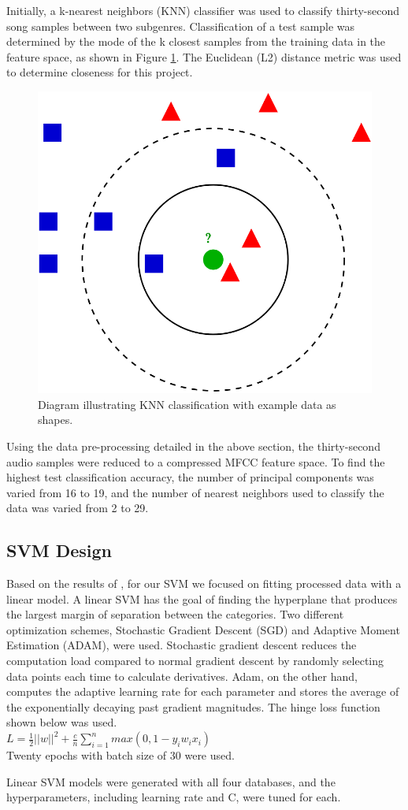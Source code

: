\documentclass[letterpaper, 12 pt, conference]{ieeeconf}  %
\begin{document}
Initially, a k-nearest neighbors (KNN) classifier was used to classify thirty-second song samples between two subgenres. 
Classification of a test sample was determined by the mode of the k closest samples from the training data in the feature space, as shown in Figure \ref{fig:knnimg}. The Euclidean (L2) distance metric was used to determine closeness for this project.
\begin{figure}[!ht]
  \centering
  \includegraphics[width=.2\textwidth]{knn_graphic.png}
  \caption{Diagram illustrating KNN classification with example data as shapes.}
  \label{fig:knnimg}
\end{figure}

Using the data pre-processing detailed in the above section, the thirty-second audio samples were reduced to a compressed MFCC feature space. To find the highest test classification accuracy, the number of principal components was varied from 16 to 19, and the number of nearest neighbors used to classify the data was varied from 2 to 29. 

\subsection{SVM Design}
Based on the results of \cite{c7}, for our SVM we focused on fitting processed data with a linear model. A linear SVM has the goal of finding the hyperplane that produces the largest margin of separation between the categories. Two different optimization schemes, Stochastic Gradient Descent (SGD) and Adaptive Moment Estimation (ADAM), were used. Stochastic gradient descent reduces the computation load compared to normal gradient descent by randomly selecting data points each time to calculate derivatives. Adam, on the other hand, computes the adaptive learning rate for each parameter and stores the average of the exponentially decaying past gradient magnitudes. The hinge loss function shown below was used.\\
$L = \frac{1}{2} ||w||^2 + \frac{c}{n}\sum_{i=1}^{n}max(0,1-y_iw_ix_i) $\\
Twenty epochs with batch size of 30 were used. 

Linear SVM models were generated with all four databases, and the hyperparameters, including learning rate and C, were tuned for each. 
\end{document}
